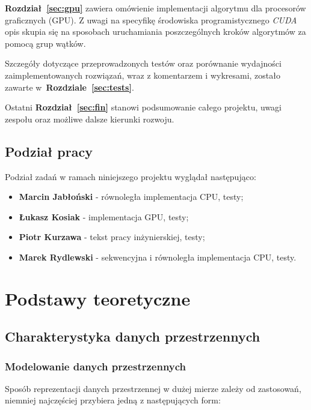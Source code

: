 \documentclass[12pt]{article}
\begin{document}
\textbf{Rozdział~\ref{sec:gpu}} zawiera omówienie implementacji algorytmu dla procesorów graficznych (GPU). Z uwagi na specyfikę środowiska programistycznego \textit{CUDA} opis skupia się na sposobach uruchamiania poszczególnych kroków algorytmów za pomocą grup wątków.

Szczegóły dotyczące przeprowadzonych testów oraz porównanie wydajności zaimplementowanych rozwiązań, wraz z komentarzem i wykresami, zostało zawarte w~\textbf{Rozdziale~\ref{sec:tests}}. 

Ostatni \textbf{Rozdział~\ref{sec:fin}} stanowi podsumowanie całego projektu, uwagi zespołu oraz możliwe dalsze kierunki rozwoju.

\subsection{Podział pracy}

Podział zadań w ramach niniejszego projektu wyglądał następująco:

\begin{itemize}
\item \textbf{Marcin Jabłoński} - równoległa implementacja CPU, testy;
\item \textbf{Łukasz Kosiak} - implementacja GPU, testy;
\item \textbf{Piotr Kurzawa} - tekst pracy inżynierskiej, testy;
\item \textbf{Marek Rydlewski} - sekwencyjna i równoległa implementacja CPU, testy.
\end{itemize}

\newpage

\section{Podstawy teoretyczne}
\label{sec:theory}

\subsection{Charakterystyka danych przestrzennych}

\subsubsection{Modelowanie danych przestrzennych}

Sposób reprezentacji danych przestrzennej w dużej mierze zależy od zastosowań, niemniej najczęściej przybiera jedną z następujących form:
\end{document}
